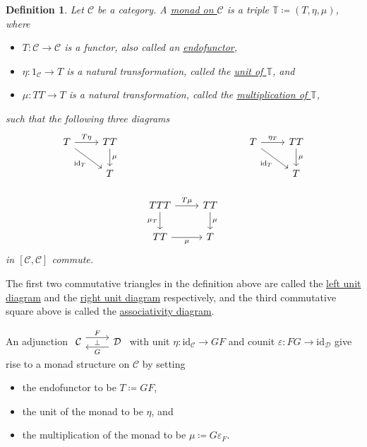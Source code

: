 \documentclass[a4paper,11pt]{article}
\theoremstyle{break_italics}
\newtheorem*{definition*}{Definition}
\theoremstyle{break_upright}
\theoremstyle{remark}
\newcommand{\id}{\mathrm{id}}
\newcommand{\C}{\mathcal{C}}
\newcommand{\D}{\mathcal{D}}
\begin{document}
\begin{definition*}
	Let $\C$ be a category. A \underline{monad on $\C$} is a triple $\mathbb T \coloneqq (T, \eta, \mu)$, where
	\begin{itemize}
		\item $T \colon \C \to \C$ is a functor, also called an \uline{endofunctor},
		\item $\eta \colon 1_\C \to T$ is a natural transformation, called the \uline{unit of $\mathbb T$}, and
		\item $\mu \colon TT \to T$ is a natural transformation, called the \uline{multiplication of $\mathbb T$},
	\end{itemize}
	such that the following three diagrams
	\[
\begin{tikzcd}
T \arrow[rd, "\id_T"'] \arrow[r, "T\eta"] & TT \arrow[d, "\mu"] &                                           &                     & T \arrow[r, "\eta_T"] \arrow[rd, "\id_T"'] & TT \arrow[d, "\mu"] \\
                                        & T                   &                                           &                     &                                          & T                   \\
                                        &                     & TTT \arrow[r, "T\mu"] \arrow[d, "\mu_T"'] & TT \arrow[d, "\mu"] &                                          &                     \\
                                        &                     & TT \arrow[r, "\mu"']                      & T                   &                                          &                    
\end{tikzcd}
	\]
	in $[\C,\C]$ commute.
\end{definition*}

The first two commutative triangles in the definition above are called the \uline{left unit diagram} and the \uline{right unit diagram} respectively, and the third commutative square above is called the \uline{associativity diagram}.

An adjunction $\begin{tikzcd}
	\C & \D
	\arrow["\bot"{description}, draw=none, from=1-1, to=1-2]
	\arrow["F", shift left=2, from=1-1, to=1-2]
	\arrow["G", shift left=2, from=1-2, to=1-1]
\end{tikzcd}$ with unit $\eta \colon \id_{\C} \to GF$ and counit $\varepsilon \colon FG \to \id_\D$ give rise to a monad structure on $\C$ by setting
\begin{itemize}
	\item the endofunctor to be $T \coloneqq GF$,
	\item the unit of the monad to be $\eta$, and
	\item the multiplication of the monad to be $\mu \coloneqq G\varepsilon_F$.
\end{itemize}
\end{document}

